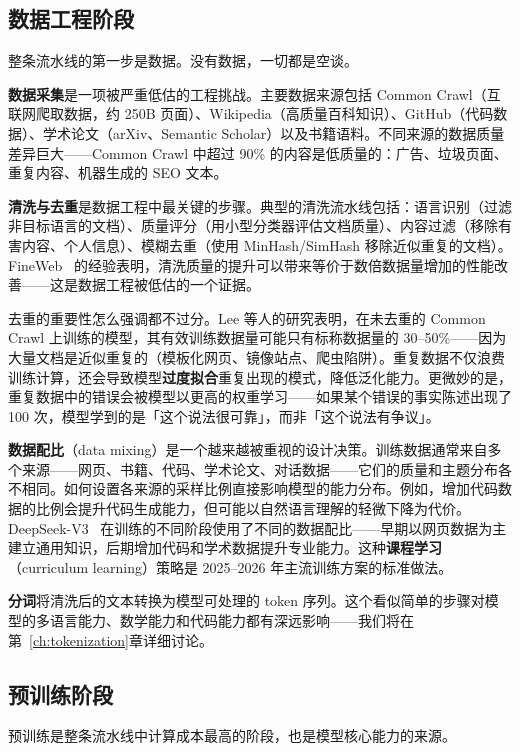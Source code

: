 \subsection{数据工程阶段}

整条流水线的第一步是数据。没有数据，一切都是空谈。

\textbf{数据采集}是一项被严重低估的工程挑战。主要数据来源包括 Common Crawl（互联网爬取数据，约 250B 页面）、Wikipedia（高质量百科知识）、GitHub（代码数据）、学术论文（arXiv、Semantic Scholar）以及书籍语料。不同来源的数据质量差异巨大——Common Crawl 中超过 90\% 的内容是低质量的：广告、垃圾页面、重复内容、机器生成的 SEO 文本。

\textbf{清洗与去重}是数据工程中最关键的步骤。典型的清洗流水线包括：语言识别（过滤非目标语言的文档）、质量评分（用小型分类器评估文档质量）、内容过滤（移除有害内容、个人信息）、模糊去重（使用 MinHash/SimHash 移除近似重复的文档）。FineWeb~\cite{penedo2024fineweb} 的经验表明，清洗质量的提升可以带来等价于数倍数据量增加的性能改善——这是数据工程被低估的一个证据。

去重的重要性怎么强调都不过分。Lee 等人的研究表明，在未去重的 Common Crawl 上训练的模型，其有效训练数据量可能只有标称数据量的 30--50\%——因为大量文档是近似重复的（模板化网页、镜像站点、爬虫陷阱）。重复数据不仅浪费训练计算，还会导致模型\textbf{过度拟合}重复出现的模式，降低泛化能力。更微妙的是，重复数据中的错误会被模型以更高的权重学习——如果某个错误的事实陈述出现了 100 次，模型学到的是「这个说法很可靠」，而非「这个说法有争议」。

\textbf{数据配比}（data mixing）是一个越来越被重视的设计决策。训练数据通常来自多个来源——网页、书籍、代码、学术论文、对话数据——它们的质量和主题分布各不相同。如何设置各来源的采样比例直接影响模型的能力分布。例如，增加代码数据的比例会提升代码生成能力，但可能以自然语言理解的轻微下降为代价。DeepSeek-V3~\cite{deepseekv3} 在训练的不同阶段使用了不同的数据配比——早期以网页数据为主建立通用知识，后期增加代码和学术数据提升专业能力。这种\textbf{课程学习}（curriculum learning）策略是 2025--2026 年主流训练方案的标准做法。

\textbf{分词}将清洗后的文本转换为模型可处理的 token 序列。这个看似简单的步骤对模型的多语言能力、数学能力和代码能力都有深远影响——我们将在第~\ref{ch:tokenization}章详细讨论。

\subsection{预训练阶段}

预训练是整条流水线中计算成本最高的阶段，也是模型核心能力的来源。

